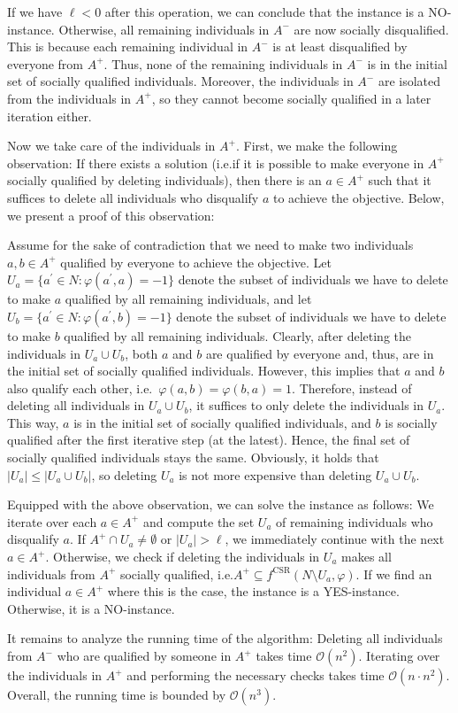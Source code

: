 \documentclass[
    12pt,               %
    a4paper,            %
    bibtotoc,           %
    pointlessnumbers,   %
    ngerman,            %
    titlepage,          %
    leqno,              %
    ]{scrarticle}       %
\begin{document}
\begin{Proof}
If we have $\ell < 0$ after this operation, we can conclude that the instance is a NO-instance. Otherwise, all remaining individuals in $A^-$ are now socially disqualified. This is because each remaining individual in $A^-$ is at least disqualified by everyone from $A^+$. Thus, none of the remaining individuals in $A^-$ is in the initial set of socially qualified individuals. Moreover, the individuals in $A^-$ are isolated from the individuals in $A^+$, so they cannot become socially qualified in a later iteration either.

Now we take care of the individuals in $A^+$. First, we make the following observation: If there exists a solution (i.e.\@ if it is possible to make everyone in $A^+$ socially qualified by deleting individuals), then there is an $a \in A^+$ such that it suffices to delete all individuals who disqualify $a$ to achieve the objective. Below, we present a proof of this observation:

Assume for the sake of contradiction that we need to make two individuals $a, b \in A^+$ qualified by everyone to achieve the objective. Let $U_a = \{ a^\prime \in N : \varphi(a^\prime, a) = -1 \}$ denote the subset of individuals we have to delete to make $a$ qualified by all remaining individuals, and let $U_b = \{ a^\prime \in N : \varphi(a^\prime, b) = -1 \}$ denote the subset of individuals we have to delete to make $b$ qualified by all remaining individuals. Clearly, after deleting the individuals in $U_a \cup U_b$, both $a$ and $b$ are qualified by everyone and, thus, are in the initial set of socially qualified individuals. However, this implies that $a$ and $b$ also qualify each other, i.e.\ $\varphi(a, b) = \varphi(b, a) = 1$. Therefore, instead of deleting all individuals in $U_a \cup U_b$, it suffices to only delete the individuals in $U_a$. This way, $a$ is in the initial set of socially qualified individuals, and $b$ is socially qualified after the first iterative step (at the latest). Hence, the final set of socially qualified individuals stays the same. Obviously, it holds that $|U_a| \leq |U_a \cup U_b|$, so deleting $U_a$ is not more expensive than deleting $U_a \cup U_b$.

Equipped with the above observation, we can solve the instance as follows: We iterate over each $a \in A^+$ and compute the set $U_a$ of remaining individuals who disqualify $a$. If $A^+ \cap U_a \neq \emptyset$ or $|U_a| > \ell$, we immediately continue with the next $a \in A^+$. Otherwise, we check if deleting the individuals in $U_a$ makes all individuals from $A^+$ socially qualified, i.e.\@ $A^+ \subseteq f^{\text{CSR}}(N \setminus U_a, \varphi)$. If we find an individual $a \in A^+$ where this is the case, the instance is a YES-instance. Otherwise, it is a NO-instance.

It remains to analyze the running time of the algorithm: Deleting all individuals from $A^-$ who are qualified by someone in $A^+$ takes time $\mathcal{O}(n^2)$. Iterating over the individuals in $A^+$ and performing the necessary checks takes time $\mathcal{O}(n \cdot n^2)$. Overall, the running time is bounded by $\mathcal{O}(n^3)$.
\end{Proof}
\end{document}
